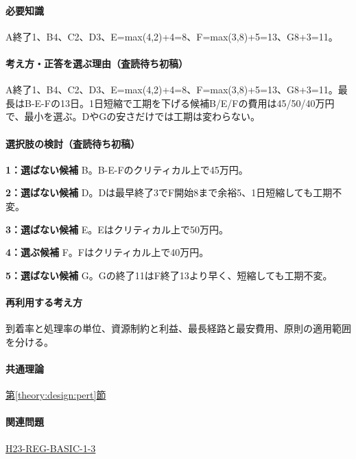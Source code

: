 \paragraph{必要知識} A終了1、B4、C2、D3、E=\allowbreak{}max(4,2)+4=\allowbreak{}8、F=\allowbreak{}max(3,8)+5=\allowbreak{}13、G8+3=\allowbreak{}11。

\paragraph{考え方・正答を選ぶ理由（査読待ち初稿）} A終了1、B4、C2、D3、E=\allowbreak{}max(4,2)+4=\allowbreak{}8、F=\allowbreak{}max(3,8)+5=\allowbreak{}13、G8+3=\allowbreak{}11。最長はB-E-Fの13日。1日短縮で工期を下げる候補B/E/Fの費用は45/50/40万円で、最小を選ぶ。DやGの安さだけでは工期は変わらない。

\paragraph{選択肢の検討（査読待ち初稿）}\mbox{}\par

\noindent\textbf{1：選ばない候補} B。B-E-Fのクリティカル上で45万円。\par

\noindent\textbf{2：選ばない候補} D。Dは最早終了3でF開始8まで余裕5、1日短縮しても工期不変。\par

\noindent\textbf{3：選ばない候補} E。Eはクリティカル上で50万円。\par

\noindent\textbf{4：選ぶ候補} F。Fはクリティカル上で40万円。\par

\noindent\textbf{5：選ばない候補} G。Gの終了11はF終了13より早く、短縮しても工期不変。\par

\paragraph{再利用する考え方} 到着率と処理率の単位、資源制約と利益、最長経路と最安費用、原則の適用範囲を分ける。

\paragraph{共通理論} \hyperref[theory:design:pert]{第\ref*{theory:design:pert}節}

\paragraph{関連問題} \hyperref[q:h23-reg-basic-1-3]{H23-REG-BASIC-1-3}

